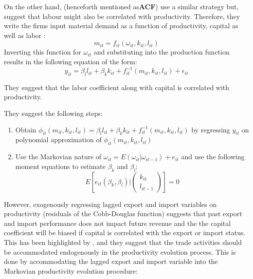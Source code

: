\documentclass[12pt]{article}
\begin{document}
On the other hand, \textcite{ackerberg2006structural} (henceforth mentioned as\textbf{ACF}) use a
similar strategy but, suggest that labour might also be
correlated with productivity. Therefore, they write  the firms input
material demand as a function of productivity, capital as well as
labor : 
$$ m_{it} = f_{it}(\omega_{it}, k_{it}, l_{it})$$
Inverting this function for $\omega_{it}$ and substituting into the
production function results in the following 
equation of the form:
\begin{equation}
y_{it} = \beta_{l}l_{it} + \beta_k k_{it} + f_{it}^{-1}(m_{it},
k_{it}, l_{it})+ \epsilon_{it}
\end{equation}


They suggest that the labor coefficient along with capital is correlated with
productivity. 

They suggest the following steps:
\begin{enumerate}
\item Obtain $\phi_{it}(m_{it}, k_{it}, l_{it}) = \beta_{l}l_{it} + \beta_k k_{it} + f_{it}^{-1}(m_{it},
k_{it}, l_{it})$ by regressing $y_{it}$ on polynomial approximation of
$\phi_{it}(m_{it}, k_{it}, l_{it})$
\item Use the Markovian nature of $\omega_{it} =
  E(\omega_{it}|\omega_{it-1}) + e_{it}$
and use the following moment equations to estimate $\beta_{k}$ and
$\beta_{l}$:
\begin{equation}
E[e_{it}(\beta_{k},\beta_{l})|\begin{pmatrix}k_{it}\\ l_{it-1}
\end{pmatrix}
]= 0
\end{equation}
\end{enumerate} 


However, exogenously regressing lagged  export and import variables  on
productivity (residuals of the Cobb-Douglas function) suggests that past
export and import performance  does not impact future revenue and the
the capital coefficient will be biased if capital is correlated with the
export or import status.  This has been highlighted by \textcite{de2013detecting}, and
they suggest that the trade activities should be accommodated
endogenously in the productivity evolution process. This is done by
accommodating the lagged export and import variable into the
Markovian productivity evolution procedure:
\end{document}
